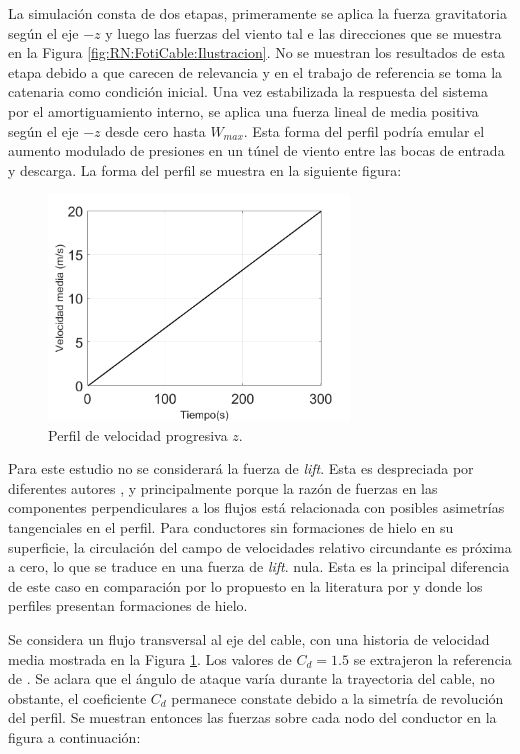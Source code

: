 La simulación consta de dos etapas, primeramente se aplica la fuerza gravitatoria según el eje $-z$  y luego las fuerzas del viento tal e las direcciones que se muestra en la Figura \ref{fig:RN:FotiCable:Ilustracion}. No se muestran los resultados de esta etapa debido a que carecen de relevancia y en el trabajo de referencia se toma la catenaria como condición inicial. Una vez estabilizada la respuesta del sistema por el amortiguamiento interno, se aplica una fuerza lineal de media positiva según el eje $-z$ desde cero hasta $W_{max}$. Esta forma del perfil podría emular el aumento modulado de presiones en un túnel de viento entre las bocas de entrada y descarga. La forma del perfil se muestra en la siguiente figura:
\begin{figure}[ht!]
	\centering
	\includegraphics[width=80mm]{./imagenes/ResultadosNumericos/SimpleCable/PerfilVm_TL_Foti.png}
	\caption{Perfil de velocidad progresiva $z$.}
	\label{fig:RN:FotiCable:VelocidadCable}
\end{figure}

Para este estudio no se considerará la fuerza de \textit{lift}. Esta es despreciada por diferentes autores \cite{lee1992nonlinear}, \cite{Foti2016} y \cite{Papailiou1997} principalmente porque la razón de fuerzas en las componentes perpendiculares a los flujos está relacionada con posibles asimetrías tangenciales en el perfil. Para conductores sin formaciones de hielo en su superficie, la circulación del campo de velocidades relativo circundante es próxima a cero, lo que se traduce en una fuerza de \textit{lift}. nula. Esta es la principal diferencia de este caso en comparación por lo propuesto en la literatura por \cite{luongo1984planar} y \cite{foti2018finite} donde los perfiles presentan formaciones de hielo.

Se considera un flujo transversal al eje del cable, con una historia de velocidad media mostrada en la Figura \ref{fig:RN:FotiCable:VelocidadCable}. Los valores de $C_d=1.5$ se extrajeron la referencia de \citep{foti2018finite}. Se aclara que el ángulo de ataque varía durante la trayectoria del cable, no obstante, el coeficiente $C_d$ permanece constate debido a la simetría de revolución del perfil. Se muestran entonces las fuerzas sobre cada nodo del conductor en la figura a continuación:



